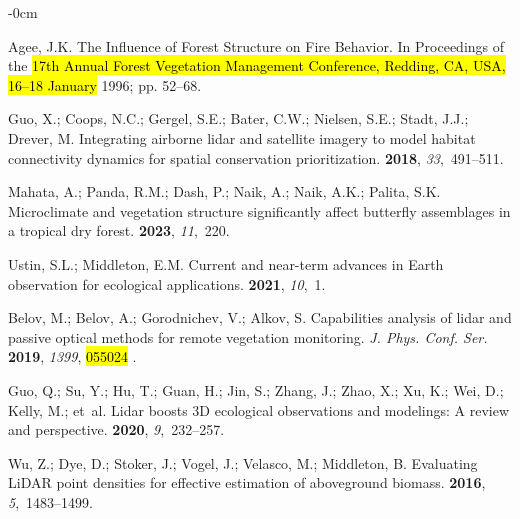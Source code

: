 \documentclass[remotesensing,article,accept,pdftex,moreauthors]{Definitions/mdpi}
\begin{document}
\begin{adjustwidth}{-\extralength}{0cm}
\begin{thebibliography}{999}
Agee, J.K.
\newblock The Influence of Forest Structure on Fire Behavior. In Proceedings of the \hl{17th Annual Forest Vegetation Management Conference, Redding, CA, USA, 16–18 January} %
 1996;
\newblock pp. 52--68.

Guo, X.; Coops, N.C.; Gergel, S.E.; Bater, C.W.; Nielsen, S.E.; Stadt, J.J.;
  Drever, M.
\newblock Integrating airborne lidar and satellite imagery to model habitat
  connectivity dynamics for spatial conservation prioritization.
 {\bf 2018}, {\em 33},~491--511.

Mahata, A.; Panda, R.M.; Dash, P.; Naik, A.; Naik, A.K.; Palita, S.K.
\newblock Microclimate and vegetation structure significantly affect butterfly
  assemblages in a tropical dry forest.
 {\bf 2023}, {\em 11},~220.

Ustin, S.L.; Middleton, E.M.
\newblock Current and near-term advances in Earth observation for ecological
  applications.
 {\bf 2021}, {\em 10},~1.

Belov, M.; Belov, A.; Gorodnichev, V.; Alkov, S.
\newblock Capabilities analysis of lidar and passive optical methods for remote
  vegetation monitoring.
\newblock \emph{J. Phys. Conf. Ser.} \textbf{2019}, \emph{1399}, \hl{055024}%
.

Guo, Q.; Su, Y.; Hu, T.; Guan, H.; Jin, S.; Zhang, J.; Zhao, X.; Xu, K.; Wei,
  D.; Kelly, M.;  et~al.
\newblock Lidar boosts 3D ecological observations and modelings: A review and
  perspective.
 {\bf 2020}, {\em
  9},~232--257.

Wu, Z.; Dye, D.; Stoker, J.; Vogel, J.; Velasco, M.; Middleton, B.
\newblock Evaluating LiDAR point densities for effective estimation of
  aboveground biomass.
 {\bf
  2016}, {\em 5},~1483--1499.


\end{thebibliography}
\end{adjustwidth}
\end{document}
